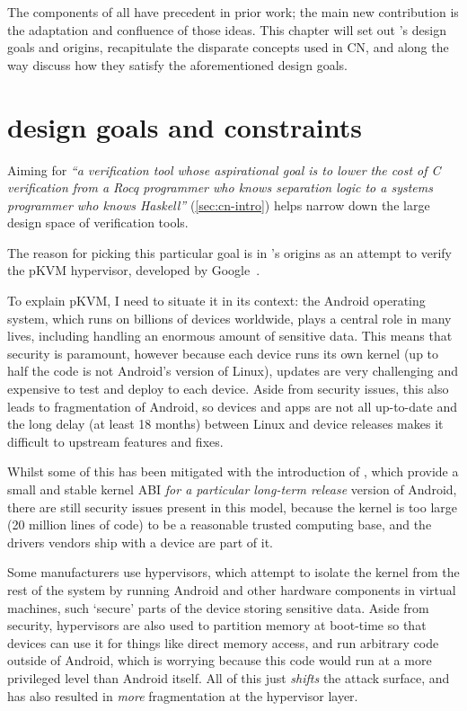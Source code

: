 \margintoc{}

The components of  all have precedent in prior work; the main
new contribution is the adaptation and confluence of those ideas. This chapter
will set out 's design goals and origins, recapitulate the disparate
concepts used in CN, and along the way discuss how they satisfy the
aforementioned design goals.

\section{ design goals and constraints}%
\label{sec:cn-goals}

Aiming for \emph{``a verification tool whose aspirational goal is to lower the
cost of C verification from a Rocq programmer who knows separation logic to a
systems programmer who knows Haskell''} (\cref{sec:cn-intro}) helps narrow
down the large design space of verification tools.

The reason for picking this particular goal is in 's origins as an
attempt to verify the pKVM hypervisor, developed by
Google~\cite{deacon2020virtualization}.

To explain pKVM, I need to situate it in its context: the Android operating
system, which runs on billions of devices worldwide, plays a central role in
many lives, including handling an enormous amount of sensitive data. This means
that security is paramount, however because each device runs its own kernel (up
to half the code is not Android's version of Linux), updates are very
challenging and expensive to test and deploy to each device. Aside from
security issues, this also leads to fragmentation of Android, so devices and
apps are not all up-to-date and the long delay (at least 18 months) between
Linux and device releases makes it difficult to upstream features and fixes.%


Whilst some of this has been mitigated with the introduction of
,
which provide a small and stable kernel ABI \emph{for a particular long-term
release} version of Android, there are still security issues present in this
model, because the kernel is too large (20 million lines of code) to be a
reasonable trusted computing base, and the drivers vendors ship with a device
are part of it.

Some manufacturers use hypervisors, which attempt to isolate the kernel from
the rest of the system by running Android and other hardware components in
virtual machines, such `secure' parts of the device storing sensitive data.
Aside from security, hypervisors are also used to partition memory at boot-time
so that devices can use it for things like direct memory access, and run
arbitrary code outside of Android, which is worrying because this code would
run at a more privileged level than Android itself. All of this just
\emph{shifts} the attack
surface,
and has also resulted in \emph{more} fragmentation at the hypervisor layer.

